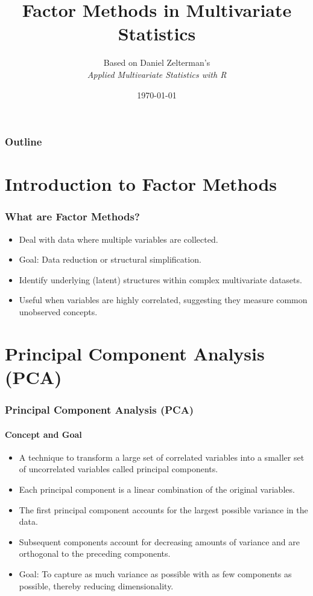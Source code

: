 \documentclass{beamer}
\title{Factor Methods in Multivariate Statistics}
\author{Based on Daniel Zelterman's \\ \textit{Applied Multivariate Statistics with R}}
\date{\today}
\begin{document}
\frame{\titlepage}

\begin{frame}
    \frametitle{Outline}
    \tableofcontents
\end{frame}

\section{Introduction to Factor Methods}

\begin{frame}
    \frametitle{What are Factor Methods?}
    \begin{itemize}
        \item Deal with data where multiple variables are collected.
        \item Goal: \alert{Data reduction} or \alert{structural simplification}.
        \item Identify underlying (latent) structures within complex multivariate datasets.
        \item Useful when variables are highly correlated, suggesting they measure common unobserved concepts.
    \end{itemize}
\end{frame}

\section{Principal Component Analysis (PCA)}

\begin{frame}
    \frametitle{Principal Component Analysis (PCA)}
    \framesubtitle{Concept and Goal}
    \begin{itemize}
        \item A technique to transform a large set of correlated variables into a smaller set of uncorrelated variables called \alert{principal components}.
        \item Each principal component is a linear combination of the original variables.
        \item The first principal component accounts for the largest possible variance in the data.
        \item Subsequent components account for decreasing amounts of variance and are \alert{orthogonal} to the preceding components.
        \item Goal: To capture as much variance as possible with as few components as possible, thereby reducing dimensionality.
    \end{itemize}
\end{frame}
\end{document}
